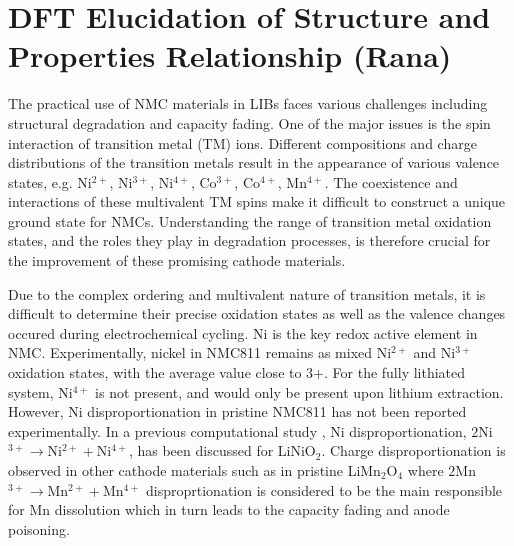\documentclass[aps,prb,twocolumn,superscriptaddress,reprint]{revtex4-1}
\begin{document}
\section{DFT Elucidation of Structure and Properties Relationship (Rana)}
The practical use of NMC materials in LIBs faces various challenges including structural degradation and capacity fading. One of the major issues is the spin interaction of transition metal (TM) ions. \cite{Feng-2019, Xia2018} Different compositions and charge distributions of the transition metals result in the appearance of various valence states, e.g. Ni$^{2+}$, Ni$^{3+}$, Ni$^{4+}$, Co$^{3+}$, Co$^{4+}$, Mn$^{4+}$. \cite{Xiao_NanoEner2018} The coexistence and interactions of these multivalent TM spins make it difficult to construct a unique ground state for NMCs. \cite{Xiao_NanoEner2018} Understanding the range of transition metal oxidation states, and the roles they play in degradation processes, is therefore crucial for the improvement of these promising cathode materials.

Due to the complex ordering and multivalent nature of transition metals, it is difficult to determine their precise oxidation states as well as the valence changes occured during electrochemical cycling.  Ni is the key redox active element in NMC. Experimentally, nickel in NMC811 remains as mixed Ni$^{2+}$ and Ni$^{3+}$ oxidation states, with the average value close to 3+. \cite{Zhu_JMatChemA2019,Katharina-chemmater,Kondrakov_JPhysChemC2017} For the fully lithiated system, Ni$^{4+}$ is not present, and would only be present upon lithium extraction. \cite{Katharina-chemmater} However, Ni disproportionation in pristine NMC811 has not been reported experimentally. In a previous computational study \cite{HChen_PhysRevB2011},  Ni disproportionation, $2$Ni$^{3+}\rightarrow$Ni$^{2+} + $Ni$^{4+}$, has been discussed for LiNiO$_2$. Charge disproportionation is observed in other cathode materials such as in pristine LiMn$_2$O$_4$ where  $2$Mn$^{3+}\rightarrow$Mn$^{2+} + $Mn$^{4+}$ disproprtionation is considered to be the main responsible for Mn dissolution which in turn leads to the capacity fading and anode poisoning. \cite{Parmar-LMO-2020,PASQUALINI2017} %
\end{document}
